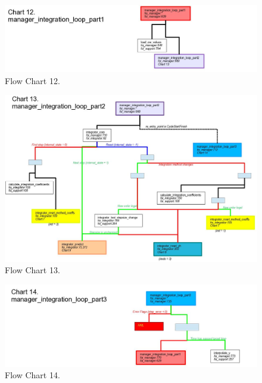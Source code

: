 \begin{figure}[htp]
\begin{center}
\includegraphics[width=6.5in]{figures/lsode_flow12.jpg}
\caption{Flow Chart 12.}
\end{center}
\end{figure}

\begin{figure}[htp]
\begin{center}
\includegraphics[width=6.5in]{figures/lsode_flow13.jpg}
\caption{Flow Chart 13.}
\end{center}
\end{figure}

\begin{figure}[htp]
\begin{center}
\includegraphics[width=6.5in]{figures/lsode_flow14.jpg}
\caption{Flow Chart 14.}
\end{center}
\end{figure}


